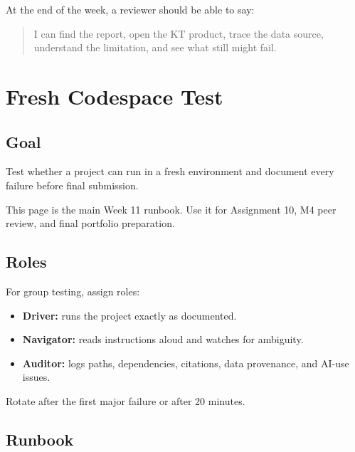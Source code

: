 \documentclass[
  letterpaper,
  DIV=11,
  numbers=noendperiod,
  oneside]{scrreprt}
\providecommand{\tightlist}{%
  \setlength{\itemsep}{0pt}\setlength{\parskip}{0pt}}
\begin{document}

At the end of the week, a reviewer should be able to say:

\begin{quote}
I can find the report, open the KT product, trace the data source,
understand the limitation, and see what still might fail.
\end{quote}

\chapter*{Fresh Codespace Test}\label{fresh-codespace-test}


\section*{Goal}\label{goal-11}


Test whether a project can run in a fresh environment and document every
failure before final submission.

This page is the main Week 11 runbook. Use it for Assignment 10, M4 peer
review, and final portfolio preparation.

\section*{Roles}\label{roles}


For group testing, assign roles:

\begin{itemize}
\tightlist
\item
  \textbf{Driver:} runs the project exactly as documented.
\item
  \textbf{Navigator:} reads instructions aloud and watches for
  ambiguity.
\item
  \textbf{Auditor:} logs paths, dependencies, citations, data
  provenance, and AI-use issues.
\end{itemize}

Rotate after the first major failure or after 20 minutes.

\section*{Runbook}\label{runbook}
\end{document}
